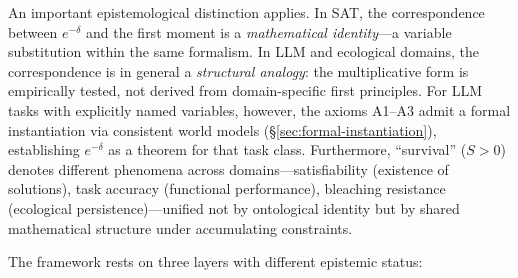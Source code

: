 \documentclass[11pt,a4paper]{article}
\begin{document}
An important epistemological distinction applies. In SAT, the correspondence between $e^{-\delta}$ and the first moment is a \emph{mathematical identity}---a variable substitution within the same formalism. In LLM and ecological domains, the correspondence is in general a \emph{structural analogy}: the multiplicative form is empirically tested, not derived from domain-specific first principles. For LLM tasks with explicitly named variables, however, the axioms A1--A3 admit a formal instantiation via consistent world models (\S\ref{sec:formal-instantiation}), establishing $e^{-\delta}$ as a theorem for that task class. Furthermore, ``survival'' ($S > 0$) denotes different phenomena across domains---satisfiability (existence of solutions), task accuracy (functional performance), bleaching resistance (ecological persistence)---unified not by ontological identity but by shared mathematical structure under accumulating constraints.

The framework rests on three layers with different epistemic status:
\end{document}
